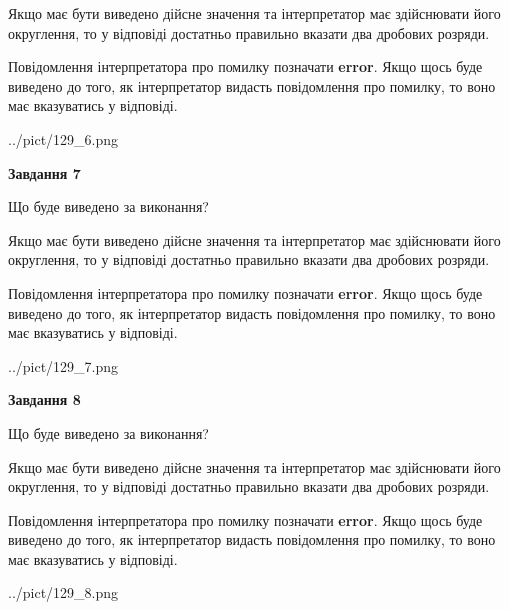 \documentclass[12pt, ukrainian]{article}
\begin{document}
{\begin {Large}
Якщо має бути виведено дійсне значення та інтерпретатор має здійснювати його округлення, 
то у відповіді достатньо правильно вказати два дробових розряди.

Повідомлення інтерпретатора про помилку позначати \textbf{error}.
Якщо щось буде виведено до того, як інтерпретатор видасть повідомлення про помилку, 
то воно має вказуватись у відповіді. \par

\begin{center}
	{../pict/129_6.png}
\end{center}
\newpage

{\begin {center}\textbf{Завдання 7}\end {center}}\par
Що буде виведено за виконання? \par

Якщо має бути виведено дійсне значення та інтерпретатор має здійснювати його округлення, 
то у відповіді достатньо правильно вказати два дробових розряди.

Повідомлення інтерпретатора про помилку позначати \textbf{error}.
Якщо щось буде виведено до того, як інтерпретатор видасть повідомлення про помилку, 
то воно має вказуватись у відповіді. \par

\begin{center}
	{../pict/129_7.png}
\end{center}
\newpage

{\begin {center}\textbf{Завдання 8}\end {center}}\par
Що буде виведено за виконання? \par

Якщо має бути виведено дійсне значення та інтерпретатор має здійснювати його округлення, 
то у відповіді достатньо правильно вказати два дробових розряди.

Повідомлення інтерпретатора про помилку позначати \textbf{error}.
Якщо щось буде виведено до того, як інтерпретатор видасть повідомлення про помилку, 
то воно має вказуватись у відповіді. \par

\begin{center}
	{../pict/129_8.png}
\end{center}
\newpage


\end{Large}}
\end{document}
